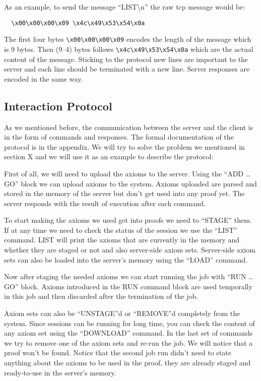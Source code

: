 As an example, to send the message ``LIST\textbackslash{}n'' the raw \ac{tcp} message would be:
\begin{lstlisting}
  \x00\x00\x00\x09 \x4c\x49\x53\x54\x0a
\end{lstlisting}
The first four bytes \lstinline{\x00\x00\x00\x09} encodes the length of the message which is 9 bytes. Then (9--4) bytes follows \lstinline{\x4c\x49\x53\x54\x0a} which are the actual content of the message. Sticking to the protocol new lines are important to the server and each line should be terminated with a new line. Server responses are encoded in the same way.

\subsection{Interaction Protocol}\label{subsec:interactionProtocol}
As we mentioned before, the communication between the server and the client is in the form of commands and responses. The formal documentation of the protocol is in the appendix. We will try to solve the problem we mentioned in section X and we will use it as an example to describe the protocol:

First of all, we will need to upload the axioms to the server. Using the ``ADD \ldots GO'' block we can upload axioms to the system. Axioms uploaded are parsed and stored in the memory of the server but don't get used into any proof yet. The server responds with the result of execution after each command.

To start making the axioms we used get into proofs we need to ``STAGE'' them. If at any time we need to check the status of the session we use the ``LIST'' command. LIST will print the axioms that are currently in the memory and whether they are staged or not and also server-side axiom sets. Server-side axiom sets can also be loaded into the server's memory using the ``LOAD'' command.

Now after staging the needed axioms we can start running the job with ``RUN \ldots GO'' block. Axioms introduced in the RUN command block are used temporally in this job and then discarded after the termination of the job.

Axiom sets can also be ``UNSTAGE''d or ``REMOVE''d completely from the system. Since sessions can be running for long time, you can check the content of any axiom set using the ``DOWNLOAD'' command. In the last set of commands we try to remove one of the axiom sets and re-run the job. We will notice that a proof won't be found. Notice that the second job run didn't need to state anything about the axioms to be used in the proof, they are already staged and ready-to-use in the server's memory.
